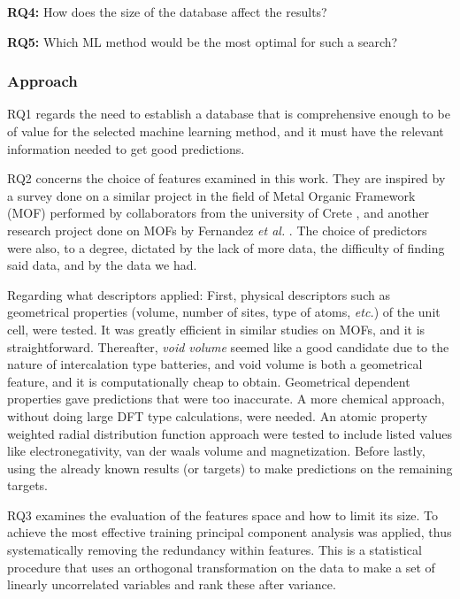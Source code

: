\textbf{RQ4:} How does the size of the database affect the results?

\textbf{RQ5:} Which ML method would be the most optimal for such a search?


\subsubsection{Approach}

RQ1 regards the need to establish a database that is comprehensive enough to be of value for the selected machine learning method, and it must have the relevant information needed to get good predictions.

RQ2 concerns the choice of features examined in this work. They are inspired by a survey done on a similar project in the field of Metal Organic Framework (\ac{MOF}) performed by collaborators from the university of Crete \cite{fanourgakis2019robust} \cite{fanourgakis2020universal}, and another research project done on MOFs by Fernandez \textit{et al.} \cite{fernandez2013atomic}. The choice of predictors were also, to a degree, dictated by the lack of more data, the difficulty of finding said data, and by the data we had. 

Regarding what descriptors applied: First, physical descriptors such as geometrical properties (volume, number of sites, type of atoms, \textit{etc.}) of the unit cell, were tested. It was greatly efficient in similar studies on MOFs, and it is straightforward. Thereafter, \textit{void volume} seemed like a good candidate due to the nature of intercalation type batteries, and void volume is both a geometrical feature, and it is computationally cheap to obtain. Geometrical dependent properties gave predictions that were too inaccurate. A more chemical approach, without doing large DFT type calculations, were needed. An atomic property weighted radial distribution function approach were tested to include listed values like electronegativity, van der waals volume and magnetization. Before lastly, using the already known results (or targets) to make predictions on the remaining targets.

RQ3 examines the evaluation of the features space and how to limit its size. To achieve the most effective training principal component analysis was applied, thus systematically removing the redundancy within features. This is a statistical procedure that uses an orthogonal transformation on the data to make a set of linearly uncorrelated variables and rank these after variance. 

